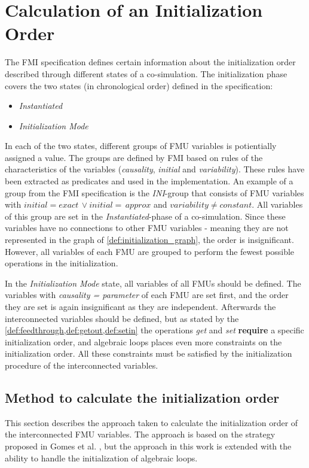 \section{Calculation of an Initialization Order}\label{sc:initilization}
The FMI specification defines certain information about the initialization order described through different states of a co-simulation. The initialization phase covers the two states (in chronological order) defined in the specification:
\begin{itemize}
    \item \textit{Instantiated}
    \item \textit{Initialization Mode}
\end{itemize}
In each of the two states, different groups of FMU variables is potientially assigned a value. The groups are defined by FMI based on rules of the characteristics of the variables (\textit{causality}, \textit{initial} and \textit{variability}). These rules have been extracted as predicates and used in the implementation. 
An example of a group from the FMI specification is the \textit{INI}-group that consists of FMU variables with $initial = exact\, \lor initial = \,approx $  and $variability \neq constant$. All variables of this group are set in the \textit{Instantiated}-phase of a co-simulation. Since these variables have no connections to other FMU variables - meaning they are not represented in the graph of \cref{def:initialization_graph}, the order is insignificant. However, all variables of each FMU are grouped to perform the fewest possible operations in the initialization. 

In the \textit{Initialization Mode} state, all variables of all FMUs should be defined.
The variables with \textit{causality = parameter} of each FMU are set first, and the order they are set is again insignificant as they are independent.
Afterwards the interconnected variables should be defined, but as stated by the \cref{def:feedthrough,def:getout,def:setin} the operations \textit{get} and \textit{set} \textbf{require} a specific initialization order, and algebraic loops places even more constraints on the initialization order. All these constraints must be satisfied by the initialization procedure of the interconnected variables.

\subsection{Method to calculate the initialization order}
This section describes the approach taken to calculate the initialization order of the interconnected FMU variables. The approach is based on the strategy proposed in Gomes et al. \cite{Gomes2019b, BromanCompositionCo-Simulation}, but the approach in this work is extended with the ability to handle the initialization of algebraic loops. 

